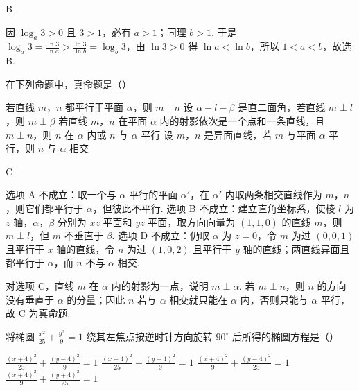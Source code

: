 \begin{answer}
B
\end{answer}

\begin{solution}
因 \(\log_a3>0\) 且 \(3>1\)，必有 \(a>1\)；同理 \(b>1\). 于是
\(\log_a3=\frac{\ln3}{\ln a}>\frac{\ln3}{\ln b}=\log_b3\)，由 \(\ln3>0\) 得 \(\ln a<\ln b\)，所以 \(1<a<b\)，故选 B.
\end{solution}

\begin{problem}
在下列命题中，真命题是（\quad）

\choices
    {若直线 \(m\)，\(n\) 都平行于平面 \(\alpha\)，则 \(m\parallel n\)}
    {设 \(\alpha-l-\beta\) 是直二面角，若直线 \(m\perp l\)，则 \(m\perp\beta\)}
    {若直线 \(m\)，\(n\) 在平面 \(\alpha\) 内的射影依次是一个点和一条直线，且 \(m\perp n\)，则 \(n\) 在 \(\alpha\) 内或 \(n\) 与 \(\alpha\) 平行}
    {设 \(m\)，\(n\) 是异面直线，若 \(m\) 与平面 \(\alpha\) 平行，则 \(n\) 与 \(\alpha\) 相交}
\end{problem}

\begin{answer}
C
\end{answer}

\begin{solution}
选项 A 不成立：取一个与 \(\alpha\) 平行的平面 \(\alpha'\)，在 \(\alpha'\) 内取两条相交直线作为 \(m\)，\(n\)，则它们都平行于 \(\alpha\)，但彼此不平行. 选项 B 不成立：建立直角坐标系，使棱 \(l\) 为 \(z\) 轴，\(\alpha\)，\(\beta\) 分别为 \(xz\) 平面和 \(yz\) 平面，取方向向量为 \((1,1,0)\) 的直线 \(m\)，则 \(m\perp l\)，但 \(m\) 不垂直于 \(\beta\). 选项 D 不成立：仍取 \(\alpha\) 为 \(z=0\)，令 \(m\) 为过 \((0,0,1)\) 且平行于 \(x\) 轴的直线，令 \(n\) 为过 \((1,0,2)\) 且平行于 \(y\) 轴的直线；两直线异面且都平行于 \(\alpha\)，而 \(n\) 不与 \(\alpha\) 相交.

对选项 C，直线 \(m\) 在 \(\alpha\) 内的射影为一点，说明 \(m\perp\alpha\). 若 \(m\perp n\)，则 \(n\) 的方向没有垂直于 \(\alpha\) 的分量；因此 \(n\) 若与 \(\alpha\) 相交就只能在 \(\alpha\) 内，否则只能与 \(\alpha\) 平行，故 C 为真命题.
\end{solution}

\begin{problem}
将椭圆 \(\frac{x^2}{25}+\frac{y^2}{9}=1\) 绕其左焦点按逆时针方向旋转 \(90^\circ\) 后所得的椭圆方程是（\quad）

\choices
    {\(\frac{(x+4)^2}{25}+\frac{(y-4)^2}{9}=1\)}
    {\(\frac{(x+4)^2}{25}+\frac{(y+4)^2}{9}=1\)}
    {\(\frac{(x+4)^2}{9}+\frac{(y-4)^2}{25}=1\)}
    {\(\frac{(x+4)^2}{9}+\frac{(y+4)^2}{25}=1\)}
\end{problem}

